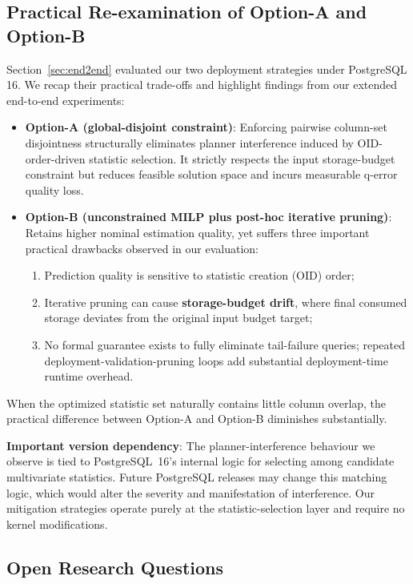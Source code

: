 \documentclass[sigconf, nonacm]{acmart}
\begin{document}
\subsection{Practical Re-examination of Option-A and Option-B}
\label{sec:option_ab_revisit}
\label{sec:disc-fix}

Section~\ref{sec:end2end} evaluated our two deployment strategies under PostgreSQL 16.
We recap their practical trade-offs and highlight findings from our extended end-to-end experiments:
\begin{itemize}
    \item \textbf{Option-A (global-disjoint constraint)}: Enforcing pairwise column-set disjointness structurally eliminates planner interference induced by OID-order-driven statistic selection. It strictly respects the input storage-budget constraint but reduces feasible solution space and incurs measurable q-error quality loss.
    \item \textbf{Option-B (unconstrained MILP plus post-hoc iterative pruning)}: Retains higher nominal estimation quality, yet suffers three important practical drawbacks observed in our evaluation:
    \begin{enumerate}
        \item Prediction quality is sensitive to statistic creation (OID) order;
        \item Iterative pruning can cause \textbf{storage-budget drift}, where final consumed storage deviates from the original input budget target;
        \item No formal guarantee exists to fully eliminate tail-failure queries; repeated deployment-validation-pruning loops add substantial deployment-time runtime overhead.
    \end{enumerate}
\end{itemize}

When the optimized statistic set naturally contains little column overlap, the practical difference between Option-A and Option-B diminishes substantially.

\noindent\textbf{Important version dependency}: The planner-interference behaviour we observe is tied to PostgreSQL~16's internal logic for selecting among candidate multivariate statistics. Future PostgreSQL releases may change this matching logic, which would alter the severity and manifestation of interference. Our mitigation strategies operate purely at the statistic-selection layer and require no kernel modifications.

\subsection{Open Research Questions}
\label{sec:open_questions}
\end{document}
